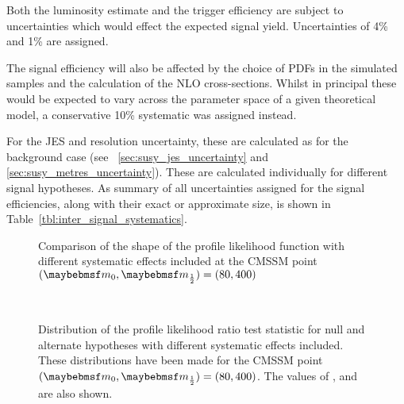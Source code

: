 Both the luminosity estimate and the trigger efficiency are subject to
uncertainties which would effect the expected signal yield. Uncertainties of 4\%
and 1\% are assigned.

The signal efficiency will also be affected by the choice of \acp{PDF} in the
simulated samples and the calculation of the \ac{NLO} cross-sections. Whilst in
principal these would be expected to vary across the parameter space of a given
theoretical model, a conservative 10\% systematic was assigned instead.

For the \ac{JES} and \MET resolution uncertainty, these are calculated
as for the background case (see \secs~\ref{sec:susy_jes_uncertainty} and
\ref{sec:susy_metres_uncertainty}). These are calculated individually for
different signal hypotheses. As summary of all uncertainties assigned for the
signal efficiencies, along with their exact or approximate size, is shown in
Table~\ref{tbl:inter_signal_systematics}.



\begin{figure}[h!]
\centering
{}\quad
{}
\caption{Comparison of the shape of the profile likelihood function with
  different systematic effects included at the \ac{CMSSM} point $(\Mzero, \Mhalf)
  = (80, 400)$}
\label{fig:inter_pl}
\end{figure}

\begin{figure}[h!]
\centering
{}
\\
\caption[Distribution of the profile likelihood ratio test statistic for null
and alternate hypotheses with different systematic effects
included]{Distribution of the profile likelihood ratio test statistic for null
  and alternate hypotheses with different systematic effects included. These
  distributions have been made for the \ac{CMSSM} point $(\Mzero, \Mhalf) = (80,
  400)$. The values of \CLb, \CLspb and \CLs are also shown.}
\label{fig:inter_cls}
\end{figure}

